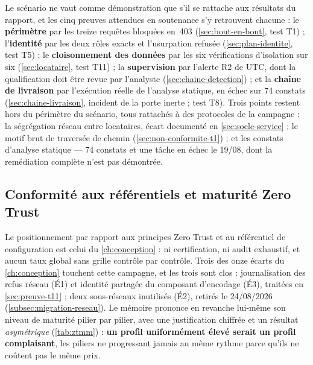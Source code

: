 Le scénario ne vaut comme démonstration que s'il se rattache aux résultats du rapport, et les cinq
preuves attendues en soutenance s'y retrouvent chacune : le \textbf{périmètre} par les treize
requêtes bloquées en~403 (\cref{sec:bout-en-bout}, test T1) ; l'\textbf{identité} par les deux rôles exacts et
l'usurpation refusée (\cref{sec:plan-identite}, test T5) ; le \textbf{cloisonnement des données} par les six
vérifications d'isolation sur six (\cref{sec:locataire}, test T11) ; la \textbf{supervision} par l'alerte R2 de
 UTC, dont la qualification doit être revue par l'analyste
(\cref{sec:chaine-detection}) ; et la
\textbf{chaîne de livraison} par l'exécution réelle de l'analyse statique, en échec sur 74
constats (\cref{sec:chaine-livraison}, incident de la porte inerte ; test T8). Trois points restent hors du périmètre du
scénario, tous rattachés à des protocoles de la campagne : la ségrégation réseau entre locataires,
écart documenté en \cref{sec:socle-service} ; le motif brut de traversée de chemin
(\cref{sec:non-conformite-t1}) ; et les constats d'analyse statique --- 74 constats et une tâche
en échec le 19/08, dont la remédiation complète n'est pas démontrée.

\subsection{Conformité aux référentiels et maturité Zero Trust}
\label{sec:maturite}

Le positionnement par rapport aux principes Zero Trust \cite{cisa_zt_maturity_model} et au
référentiel de configuration est celui du \cref{ch:conception} : ni certification, ni audit exhaustif, et
aucun taux global sans grille contrôle par contrôle. Trois des onze écarts du
\cref{ch:conception} touchent cette campagne, et les trois sont clos : journalisation des
refus réseau (É1) et identité partagée du composant d'encodage (É3), traitées en
\cref{sec:preuve-t11} ; deux sous-réseaux inutilisés (É2), retirés le 24/08/2026
(\cref{subsec:migration-reseau}). Le mémoire prononce en revanche lui-même son niveau de maturité
pilier par pilier, avec une justification chiffrée et un résultat \emph{asymétrique}
(\cref{tab:ztmm}) : \textbf{un profil uniformément élevé serait un profil complaisant}, les piliers
ne progressant jamais au même rythme parce qu'ils ne coûtent pas le même prix.

